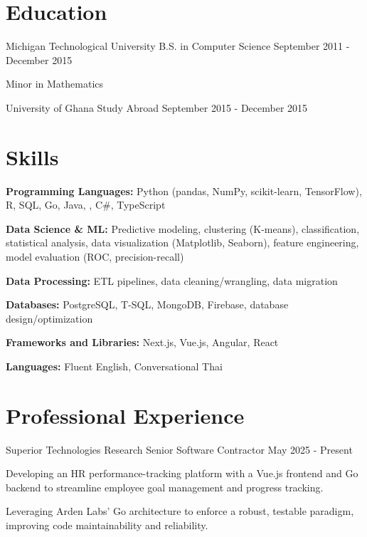 \documentclass{../styles/cv}
\begin{document}
\populatedtitle

\section{Education}
\subsectionpositiondate
    {Michigan Technological University}
    {B.S. in Computer Science}
    {September 2011 - December 2015}
\resumesublistbegin
    \item Minor in Mathematics
\resumesublistend

\subsectionpositiondate
    {University of Ghana}
    {Study Abroad}
    {September 2015 - December 2015}


\section{Skills}
\resumesublistbegin
    \item \textbf{Programming Languages:} Python (pandas, NumPy, scikit-learn, TensorFlow), R, SQL, Go, Java, \cpp, C\#, TypeScript
    \item \textbf{Data Science \& ML:} Predictive modeling, clustering (K-means), classification, statistical analysis, data visualization (Matplotlib, Seaborn), feature engineering, model evaluation (ROC, precision-recall)
    \item \textbf{Data Processing:} ETL pipelines, data cleaning/wrangling, data migration
    \item \textbf{Databases:} PostgreSQL, T-SQL, MongoDB, Firebase, database design/optimization
    \item \textbf{Frameworks and Libraries:} Next.js, Vue.js, Angular, React
    \item \textbf{Languages:} Fluent English, Conversational Thai
\resumesublistend

\section{Professional Experience}

\subsectionpositiondate
    {Superior Technologies Research}
    {Senior Software Contractor}
    {May 2025 - Present}
\resumesublistbegin
    \item Developing an HR performance-tracking platform with a Vue.js frontend and Go backend to streamline employee goal management and progress tracking.
    \item Leveraging Arden Labs' Go architecture to enforce a robust, testable paradigm, improving code maintainability and reliability.
\resumesublistend
\end{document}
